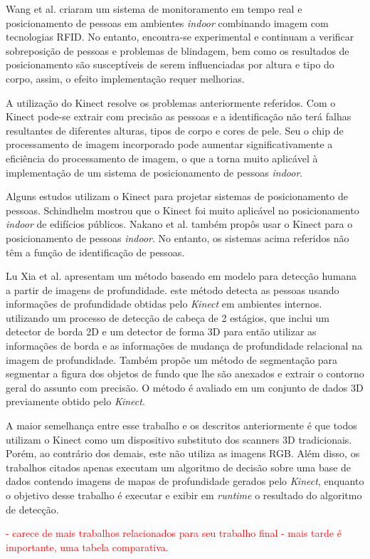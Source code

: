 Wang et al. \cite{wang2011flexible,wang2011rfid} criaram um sistema de monitoramento em tempo real e posicionamento de pessoas em ambientes \textit{indoor} combinando imagem com  tecnologias RFID. No entanto, encontra-se experimental e continuam a verificar sobreposição de pessoas e problemas de blindagem, bem como os resultados de posicionamento são susceptíveis de serem influenciadas por altura e tipo do corpo, assim, o efeito implementação requer melhorias.

A utilização do Kinect resolve os problemas anteriormente referidos. Com o Kinect pode-se extrair com precisão as pessoas e a identificação não terá falhas resultantes de diferentes alturas, tipos de corpo e cores de pele. Seu o chip de processamento de imagem incorporado pode aumentar significativamente a eficiência do processamento de imagem, o que a torna muito aplicável à implementação de um sistema de posicionamento de pessoas \textit{indoor}.

Alguns estudos utilizam o Kinect para projetar sistemas de posicionamento de pessoas. Schindhelm \cite{schindhelm2012evaluating} mostrou que o Kinect foi muito aplicável no posicionamento \textit{indoor} de edifícios públicos. Nakano et al. \cite{nakano2012kinect} também propôs usar o Kinect para o posicionamento de pessoas \textit{indoor}. No entanto, os sistemas acima referidos não têm a função de identificação de pessoas. 


Lu Xia et al. \cite{xia2011human} apresentam um método baseado em modelo para detecção humana a partir de imagens de profundidade. este método detecta as pessoas usando informações de profundidade obtidas pelo \textit{Kinect} em ambientes internos. utilizando um processo de detecção de cabeça de 2 estágios, que inclui um detector de borda 2D e um detector de forma 3D para então utilizar as informações de borda e as informações de mudança de profundidade relacional na imagem de profundidade. Também propõe um método de segmentação para segmentar a figura dos objetos de fundo que lhe são anexados e extrair o contorno geral do assunto com precisão. O método é avaliado em um conjunto de dados 3D previamente obtido pelo \textit{Kinect}.



A maior semelhança entre esse trabalho e os descritos anteriormente é que todos utilizam o Kinect como um dispositivo substituto dos scanners 3D tradicionais. Porém, ao contrário dos demais, este não utiliza as imagens RGB. Além disso, os trabalhos citados apenas executam um algoritmo de decisão sobre uma base de dados contendo imagens de mapas de profundidade gerados pelo  \textit{Kinect}, enquanto o objetivo desse trabalho é executar e exibir em  \textit{runtime} o resultado do algoritmo de detecção.


\textcolor{red}{- carece de mais trabalhos relacionados para seu trabalho final - mais tarde é importante, uma tabela comparativa.}
